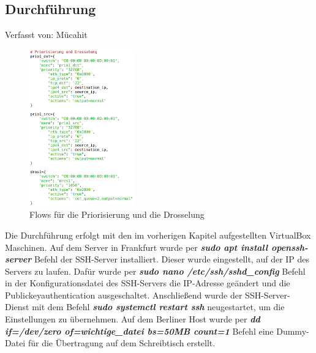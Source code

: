 \documentclass[fontsize=12pt,paper=a4,open=any,parskip=half,
  twoside=false,toc=listof,toc=bibliography,fleqn,leqno,
  captions=nooneline,captions=tableabove,british]{scrbook}
\begin{document}
\subsection{Durchführung}
{\tiny Verfasst von: Mücahit\par}
\begin{figure}
	\vspace{-\baselineskip}
 	\centering
 	\includegraphics[width=0.4\textwidth]{Bilder/transfer-flow}
 	\caption{Flows für die Priorisierung und die Drosselung}
 	\label{transfer-flow}
\end{figure}
Die Durchführung erfolgt mit den im vorherigen Kapitel aufgestellten VirtualBox Maschinen. Auf dem Server in Frankfurt wurde per \textit{\textbf{sudo apt install openssh-server}} Befehl der SSH-Server installiert. Dieser wurde eingestellt, auf der IP des Servers zu laufen. Dafür wurde per \textit{\textbf{sudo nano /etc/ssh/sshd\_config}} Befehl in der Konfigurationsdatei des SSH-Servers die IP-Adresse geändert und die Publickeyauthentication ausgeschaltet. Anschließend wurde der SSH-Server-Dienst mit dem Befehl \textit{\textbf{sudo systemctl restart ssh}} neugestartet, um die Einstellungen zu übernehmen. Auf dem Berliner Host wurde per \textit{\textbf{dd if=/dev/zero of=wichtige\_datei bs=50MB count=1}} Befehl eine Dummy-Datei für die Übertragung auf dem Schreibtisch erstellt.\par
\end{document}
